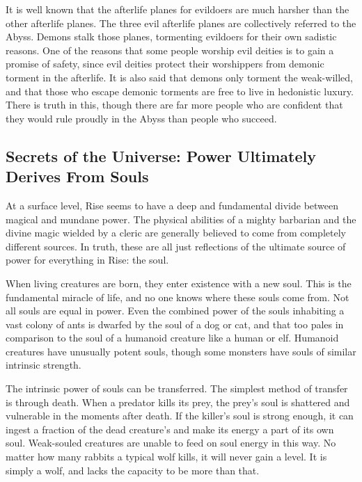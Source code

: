         It is well known that the afterlife planes for evildoers are much harsher than the other afterlife planes.
        The three evil afterlife planes are collectively referred to the Abyss.
        Demons stalk those planes, tormenting evildoers for their own sadistic reasons.
        One of the reasons that some people worship evil deities is to gain a promise of safety, since evil deities protect their worshippers from demonic torment in the afterlife.
        It is also said that demons only torment the weak-willed, and that those who escape demonic torments are free to live in hedonistic luxury.
        There is truth in this, though there are far more people who are confident that they would rule proudly in the Abyss than people who succeed.

    \subsection{Secrets of the Universe: Power Ultimately Derives From Souls}
        At a surface level, Rise seems to have a deep and fundamental divide between magical and mundane power.
        The physical abilities of a mighty barbarian and the divine magic wielded by a cleric are generally believed to come from completely different sources.
        In truth, these are all just reflections of the ultimate source of power for everything in Rise: the soul.

        When living creatures are born, they enter existence with a new soul.
        This is the fundamental miracle of life, and no one knows where these souls come from.
        Not all souls are equal in power.
        Even the combined power of the souls inhabiting a vast colony of ants is dwarfed by the soul of a dog or cat, and that too pales in comparison to the soul of a humanoid creature like a human or elf.
        Humanoid creatures have unusually potent souls, though some monsters have souls of similar intrinsic strength.

        The intrinsic power of souls can be transferred.
        The simplest method of transfer is through death.
        When a predator kills its prey, the prey's soul is shattered and vulnerable in the moments after death.
        If the killer's soul is strong enough, it can ingest a fraction of the dead creature's and make its energy a part of its own soul.
        Weak-souled creatures are unable to feed on soul energy in this way.
        No matter how many rabbits a typical wolf kills, it will never gain a level.
        It is simply a wolf, and lacks the capacity to be more than that.


